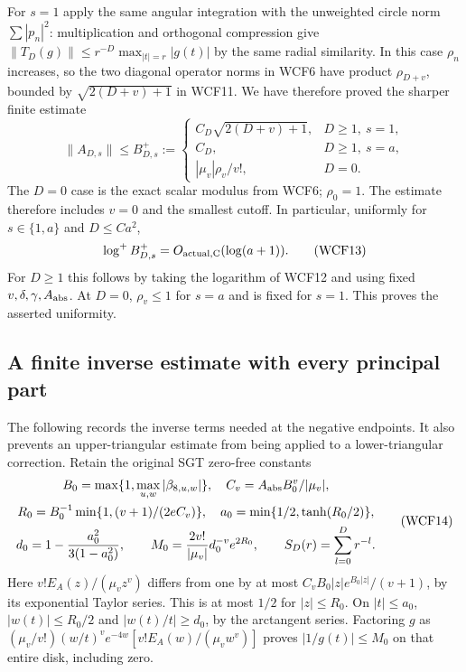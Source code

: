 \documentclass[11pt,a4paper]{article}
\begin{document}
For $s=1$ apply the same angular integration with the unweighted
circle norm $\sum|p_n|^2$: multiplication and orthogonal compression
give $\|T_D(g)\|\le r^{-D}\max_{|t|=r}|g(t)|$ by the same radial
similarity. In this case $\rho_n$ increases, so the two diagonal
operator norms in WCF6 have product $\rho_{D+v}$, bounded by
$\sqrt{2(D+v)+1}$ in WCF11. We have therefore proved the sharper
finite estimate
\[
 \boxed{\quad \|A_{D,s}\|\le B^+_{D,s}:=
 \begin{cases}
 C_D\sqrt{2(D+v)+1},&D\ge1,\ s=1,\\
 C_D,&D\ge1,\ s=a,\\
 |\mu_v|\rho_v/v!,&D=0.
 \end{cases}\quad}
 \tag{WCF12}
\]
The $D=0$ case is the exact scalar modulus from WCF6; $\rho_0=1$.
The estimate therefore includes $v=0$ and the smallest cutoff.
In particular, uniformly for $s\in\{1,a\}$ and $D\le C a^2$,
\[
 \log^+B^+_{D,s}=O_{\rm actual,C}(\log(a+1)).
 \tag{WCF13}
\]
For $D\ge1$ this follows by taking the logarithm of WCF12 and
using fixed $v,\delta,\gamma,A_{\rm abs}$. At $D=0$, $\rho_v\le1$
for $s=a$ and is fixed for $s=1$. This proves the asserted uniformity.

\subsection{A finite inverse estimate with every principal part}

The following records the inverse terms needed at the negative endpoints.
It also prevents an upper-triangular estimate from being applied to a
lower-triangular correction. Retain the original SGT zero-free constants
\[
\begin{gathered}
 B_0=\max\{1,\max_{u,w}|\beta_{8,u,w}|\},\quad
 C_v=A_{\rm abs}B_0^v/|\mu_v|,\\
 R_0=B_0^{-1}\min\{1,(v+1)/(2eC_v)\},\quad
 a_0=\min\{1/2,\tanh(R_0/2)\},\\
 d_0=1-\frac{a_0^2}{3(1-a_0^2)},\qquad
 M_0=\frac{2v!}{|\mu_v|}d_0^{-v}e^{2R_0},\qquad
 S_D(r)=\sum_{l=0}^D r^{-l}.
\end{gathered}\tag{WCF14}
\]
Here $v!E_A(z)/(\mu_vz^v)$ differs from one by at most
$C_vB_0|z|e^{B_0|z|}/(v+1)$, by its exponential Taylor series.
This is at most $1/2$ for $|z|\le R_0$. On $|t|\le a_0$,
$|w(t)|\le R_0/2$ and $|w(t)/t|\ge d_0$, by the arctangent
series. Factoring $g$ as
$(\mu_v/v!)(w/t)^ve^{-4w}[v!E_A(w)/(\mu_vw^v)]$ proves
$|1/g(t)|\le M_0$ on that entire disk, including zero.
\end{document}
